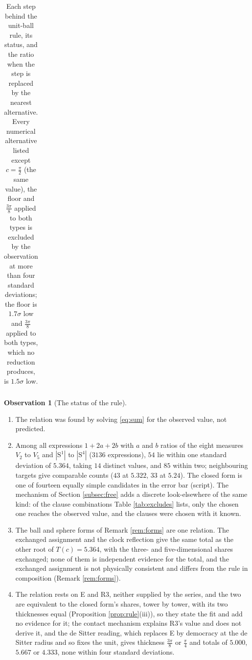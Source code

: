 \documentclass[11pt]{article}
\theoremstyle{definition}
\newtheorem{observation}[theorem]{Observation}
\newcommand{\Sph}{\mathrm{S}}
\begin{document}
\begin{table}[htbp]
\begin{tabular}{>{\raggedright\arraybackslash}p{3.4cm}>{\raggedright\arraybackslash}p{6.6cm}>{\raggedright\arraybackslash}p{3.7cm}}
\bottomrule
\end{tabular}
\caption{Each step behind the unit-ball rule, its status, and the ratio when the step is replaced by the nearest alternative. Every numerical alternative listed except $c = \tfrac{\pi}{2}$ (the same value), the floor and $\tfrac{3\pi}{8}$ applied to both types is excluded by the observation at more than four standard deviations; the floor is $1.7\sigma$ low and $\tfrac{3\pi}{8}$ applied to both types, which no reduction produces, is $1.5\sigma$ low.}
\label{tab:costs}
\end{table}

\begin{observation}[The status of the rule]\label{obs:status}
\begin{enumerate}
\item[(i)] The relation was found by solving \eqref{eq:sum} for the observed value, not predicted.
\item[(ii)] Among all expressions $1 + 2a + 2b$ with $a$ and $b$ ratios of the eight measures $V_{2}$ to $V_{5}$ and $|\Sph^{1}|$ to $|\Sph^{4}|$ ($3136$ expressions), $54$ lie within one standard deviation of $5.364$, taking $14$ distinct values, and $85$ within two; neighbouring targets give comparable counts ($43$ at $5.322$, $33$ at $5.24$). The closed form is one of fourteen equally simple candidates in the error bar (script). The mechanism of Section \ref{subsec:free} adds a discrete look-elsewhere of the same kind: of the clause combinations Table \ref{tab:excludes} lists, only the chosen one reaches the observed value, and the clauses were chosen with it known.
\item[(iii)] The ball and sphere forms of Remark \ref{rem:forms} are one relation. The exchanged assignment and the clock reflection give the same total as the other root of $T(c) = 5.364$, with the three- and five-dimensional shares exchanged; none of them is independent evidence for the total, and the exchanged assignment is not physically consistent and differs from the rule in composition (Remark \ref{rem:forms}).
\item[(iv)] The relation rests on E and R3, neither supplied by the series, and the two are equivalent to the closed form's shares, tower by tower, with its two thicknesses equal (Proposition \ref{prop:rule}(iii)), so they state the fit and add no evidence for it; the contact mechanism explains R3's value and does not derive it, and the de Sitter reading, which replaces E by democracy at the de Sitter radius and so fixes the unit, gives thickness $\tfrac{3\pi}{8}$ or $\tfrac{\pi}{4}$ and totals of $5.000$, $5.667$ or $4.333$, none within four standard deviations.

\end{enumerate}
\end{observation}
\end{document}
